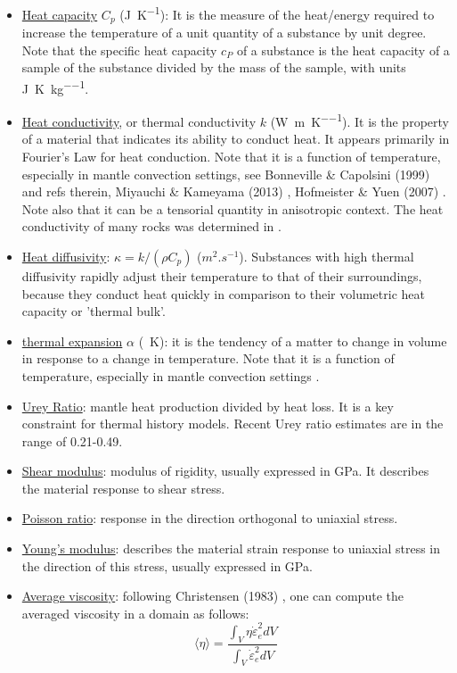 \begin{itemize}
\item \underline{Heat capacity} $C_p$ (\si{\joule\per\kelvin}): 
It is the measure of the heat/energy required to increase the 
temperature of a unit quantity of a substance by unit degree. Note that the specific 
heat capacity $c_P$ of a substance is the heat capacity of a sample of the substance 
divided by the mass of the sample, with units \si{\joule\per\kelvin\per\kg}.

\item \underline{Heat conductivity}, or thermal conductivity $k$ (\si{\watt\per\metre\per\kelvin}). 
It is the property of a material that indicates its ability to conduct heat. It appears primarily 
in Fourier's Law for heat conduction.
Note that it is a function of temperature, especially in mantle convection settings,
see Bonneville \& Capolsini (1999) \cite{boca99} and refs therein, 
Miyauchi \& Kameyama (2013) \cite{mika13}, Hofmeister \& Yuen (2007) \cite{hoyu07}. 
Note also that it can be a tensorial quantity in anisotropic context.
The heat conductivity of many rocks was determined in \cite{ando13}.

\item \underline{Heat diffusivity}: $\kappa=k/(\rho C_p)$ ($m^2.s^{-1}$). Substances with 
high thermal diffusivity rapidly adjust their temperature to that of their surroundings, because they 
conduct heat quickly in comparison to their volumetric heat capacity or 'thermal bulk'.

\item \underline{thermal expansion} $\alpha$ (\si{\per\kelvin}): 
it is the tendency of a matter to change in volume in response to a change in temperature. 
Note that it is a function of temperature, especially in mantle convection settings \cite{mika13}.

\item \underline{Urey Ratio}: mantle heat production divided by heat loss. It is a key constraint 
for thermal history models. Recent Urey ratio estimates are in the range of 0.21-0.49. \cite{lecm11}

\item \underline{Shear modulus}: modulus of rigidity, usually expressed in \si{\giga\pascal}. 
It describes the material response to shear stress.

\item \underline{Poisson ratio}: response in the direction orthogonal to uniaxial stress.

\item \underline{Young's modulus}: describes the material strain response to uniaxial stress
in the direction of this stress, usually expressed in \si{\giga\pascal}.

\item \underline{Average viscosity}: following Christensen (1983) \cite{chri83b}, 
one can compute the averaged viscosity in a domain as follows:
\begin{equation}
\langle \eta \rangle = \frac{\int_V \eta \dot{\varepsilon}_e^2 dV}{\int_V  \dot{\varepsilon}_e^2 dV }
\label{eq:avrgeta}
\end{equation}


\end{itemize}


